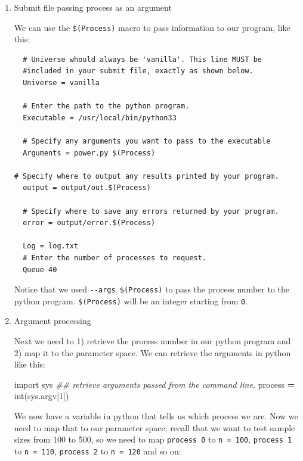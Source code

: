 \documentclass[]{book}
\newenvironment{Shaded}{\begin{snugshade}}{\end{snugshade}}
\newcommand{\DecValTok}[1]{\textcolor[rgb]{0.00,0.00,0.81}{#1}}
\newcommand{\ImportTok}[1]{#1}
\newcommand{\CommentTok}[1]{\textcolor[rgb]{0.56,0.35,0.01}{\textit{#1}}}
\newcommand{\OperatorTok}[1]{\textcolor[rgb]{0.81,0.36,0.00}{\textbf{#1}}}
\newcommand{\BuiltInTok}[1]{#1}
\newcommand{\NormalTok}[1]{#1}
\begin{document}
\begin{enumerate}
\def\labelenumi{\arabic{enumi}.}
\item
  Submit file passing process as an argument

  We can use the \texttt{\$(Process)} macro to pass information to our
  program, like this:

\begin{verbatim}
  # Universe whould always be 'vanilla'. This line MUST be
  #included in your submit file, exactly as shown below.
  Universe = vanilla

  # Enter the path to the python program.
  Executable = /usr/local/bin/python33

  # Specify any arguments you want to pass to the executable
  Arguments = power.py $(Process)

# Specify where to output any results printed by your program.
  output = output/out.$(Process)

  # Specify where to save any errors returned by your program.
  error = output/error.$(Process)

  Log = log.txt
  # Enter the number of processes to request.
  Queue 40
\end{verbatim}

  Notice that we used \texttt{-\/-args\ \$(Process)} to pass the process
  number to the python program. \texttt{\$(Process)} will be an integer
  starting from \texttt{0}.
\item
  Argument processing

  Next we need to 1) retrieve the process number in our python program
  and 2) map it to the parameter space. We can retrieve the arguments in
  python like this:

\begin{Shaded}
\begin{Highlighting}[]
\ImportTok{import}\NormalTok{ sys}
\CommentTok{## retrieve arguments passed from the command line.}
\NormalTok{process }\OperatorTok{=} \BuiltInTok{int}\NormalTok{(sys.argv[}\DecValTok{1}\NormalTok{])}
\end{Highlighting}
\end{Shaded}

  We now have a variable in python that tells us which process we are.
  Now we need to map that to our parameter space; recall that we want to
  test sample sizes from 100 to 500, so we need to map
  \texttt{process\ 0} to \texttt{n\ =\ 100}, \texttt{process\ 1} to
  \texttt{n\ =\ 110}, \texttt{process\ 2} to \texttt{n\ =\ 120} and so
  on:


\end{enumerate}
\end{document}
